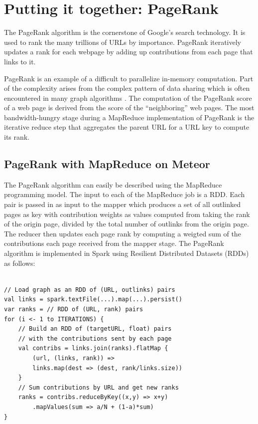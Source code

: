 \section{Putting it together: PageRank}
\label{sec:pagerank}


The PageRank algorithm is the cornerstone of Google's search technology\cite{pagerank}. It is used to rank the many trillions of URLs by importance. PageRank iteratively updates a rank for each webpage by adding up contributions from each page that links to it. 

PageRank is an example of a difficult to parallelize in-memory computation. Part of the complexity arises from the complex pattern of data sharing which is often encountered in many graph algorithms \cite{pagerank}. The computation of the PageRank score of a web page is derived from the score of the ``neighboring'' web pages. The most bandwidth-hungry stage during a MapReduce implementation of PageRank is the iterative reduce step that aggregates the parent URL for a URL key to compute its rank. 

\subsection{PageRank with MapReduce on Meteor}

 The PageRank algorithm can easily be described using the MapReduce programming model. The input to each of the MapReduce job is a  RDD. Each pair is passed in as input to the mapper which produces a set of all outlinked pages as key with contribution weights as values computed from taking the rank of the origin page, divided by the total number of outlinks from the origin page. The reducer then updates each page rank by computing a weigted sum of the contributions each page received from the mapper stage. The PageRank algorithm is implemented in Spark using Resilient Distributed Datasets (RDDs) \cite{rdd} as follows:

%
\begin{lstlisting}[label=mapreduce] 

// Load graph as an RDD of (URL, outlinks) pairs
val links = spark.textFile(...).map(...).persist()
var ranks = // RDD of (URL, rank) pairs
for (i <- 1 to ITERATIONS) {
    // Build an RDD of (targetURL, float) pairs
    // with the contributions sent by each page
    val contribs = links.join(ranks).flatMap {
        (url, (links, rank)) =>
        links.map(dest => (dest, rank/links.size))
    }
    // Sum contributions by URL and get new ranks
    ranks = contribs.reduceByKey((x,y) => x+y)
        .mapValues(sum => a/N + (1-a)*sum)
}

\end{lstlisting}
%

